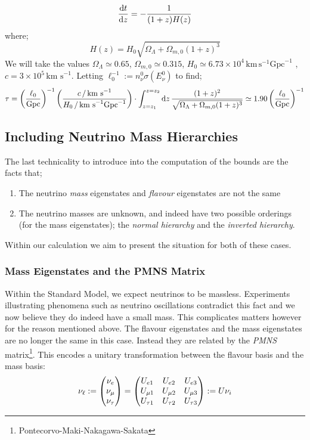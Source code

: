 \begin{equation}
  \frac{\mathrm{d} t}{\mathrm{d} z} = -\frac{1}{(1 + z)H(z)}
\end{equation}
where;
\begin{equation}
  H(z) = H_0 \sqrt{\Omega_\Lambda + \Omega_{m,0}(1 + z)^3}
\end{equation}
We will take the values $\Omega_\Lambda \simeq 0.65$, $\Omega_{m,0} \simeq 0.315$, $H_0 \simeq 6.73 \times 10^{4}\, \textrm{km}\,\textrm{s}^{-1}\textrm{Gpc}^{-1}$ \cite{Planck}, $c = 3\times 10^{5}\,\textrm{km s}^{-1}$. Letting $\ell_0^{-1} := n_\nu^0 \sigma(E_\nu^0)$ to find;
\begin{equation}
  \tau = \left(\frac{\ell_0}{\text{Gpc}}\right)^{-1} \left(\frac{c \, / \, \text{km s}^{-1}}{H_0 \, /\, \text{km s}^{-1}\text{Gpc}^{-1}}\right) \cdot \int_{z = z_1}^{z = z_2}{\mathrm{d}z\,\frac{(1 + z)^2}{\sqrt{\Omega_\Lambda + \Omega_{m,0}(1 + z)^3}}} \simeq 1.90 \left(\frac{\ell_0}{\textrm{Gpc}}\right)^{-1}
\end{equation}


\subsection{Including Neutrino Mass Hierarchies}


The last technicality to introduce into the computation of the bounds are the facts that;
\begin{enumerate}
  \item The neutrino \textit{mass} eigenstates and \textit{flavour} eigenstates are not the same
  \item The neutrino masses are unknown, and indeed have two possible orderings (for the mass eigenstates); the \textit{normal hierarchy} and the \textit{inverted hierarchy}.
\end{enumerate}
Within our calculation we aim to present the situation for both of these cases.

\subsubsection{Mass Eigenstates and the PMNS Matrix}

Within the Standard Model, we expect neutrinos to be massless. Experiments illustrating phenomena such as neutrino oscillations contradict this fact and we now believe they do indeed have a small mass. This complicates matters however for the reason mentioned above. The flavour eigenstates and the mass eigenstates are no longer the same in this case. Instead they are related by the \textit{PMNS} matrix\footnote{Pontecorvo-Maki-Nakagawa-Sakata}. This encodes a unitary transformation between the flavour basis and the mass basis:
\begin{equation}
\nu_\ell := \begin{pmatrix} \nu_e \\ \nu_\mu \\ \nu_\tau \end{pmatrix} = \begin{pmatrix}U_{e1} & U_{e2} & U_{e3} \\ U_{\mu1} & U_{\mu2} & U_{\mu3} \\ U_{\tau1} & U_{\tau2} & U_{\tau3}\end{pmatrix} := U \nu_i
\end{equation}

